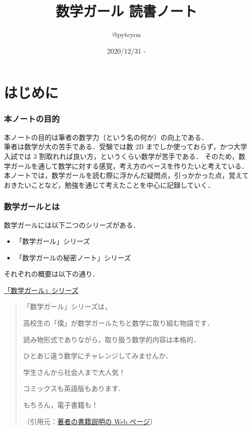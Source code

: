 \documentclass[a4j,uplatex,11pt]{jsarticle}
\title{数学ガール 読書ノート}
\author{@pyteyon}
\date{2020/12/31 -}
\newcommand{\linedhref}[2]{\underline{\href{#1}{#2}}}
\begin{document}
\maketitle
\thispagestyle{empty}

\tableofcontents
\newpage

\part*{はじめに}

\section{本ノートの目的}

本ノートの目的は筆者の数学力（という名の何か）の向上である．\\

筆者は数学が大の苦手である．受験では数 2B までしか使っておらず，かつ大学入試では 3 割取れれば良い方，というくらい数学が苦手である．
そのため，数学ガールを通して数学に対する感覚，考え方のベースを作りたいと考えている．\\

本ノートでは，数学ガールを読む際に浮かんだ疑問点，引っかかった点，覚えておきたいことなど，勉強を通じて考えたことを中心に記録していく．

\section{数学ガールとは}

数学ガールには以下二つのシリーズがある．

\begin{itemize}
	\item 「数学ガール」シリーズ
	\item 「数学ガールの秘密ノート」シリーズ
\end{itemize}

それぞれの概要は以下の通り．

\underline{「数学ガール」シリーズ}

\begin{quotation}
	「数学ガール」シリーズは，

	高校生の「僕」が数学ガールたちと数学に取り組む物語です．

	読み物形式でありながら，取り扱う数学的内容は本格的．

	ひとあじ違う数学にチャレンジしてみませんか．

	学生さんから社会人まで大人気！

	コミックスも英語版もあります．

	もちろん，電子書籍も！

	（引用元：\linedhref{https://www.hyuki.com/girl/}{著者の書籍説明の Web ページ}）
\end{quotation}
\end{document}
